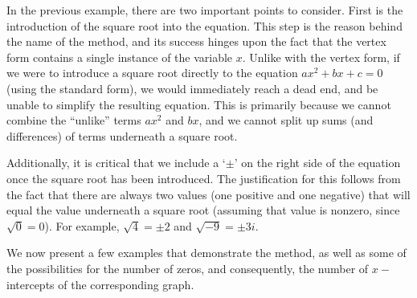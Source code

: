 \documentclass[12pt]{book}
\theoremstyle{definition}
\begin{document}
In the previous example, there are two important points to consider.  First is the introduction of the square root into the equation.  This step is the reason behind the name of the method, and its success hinges upon the fact that the vertex form contains a single instance of the variable $x$.  Unlike with the vertex form, if we were to introduce a square root directly to the equation $ax^2+bx+c=0$ (using the standard form), we would immediately reach a dead end, and be unable to simplify the resulting equation.  This is primarily because we cannot combine the ``unlike'' terms $ax^2$ and $bx$, and we cannot split up sums (and differences) of terms underneath a square root.\par
Additionally, it is critical that we include a `$\pm$' on the right side of the equation once the square root has been introduced.  The justification for this follows from the fact that there are always two values (one positive and one negative) that will equal the value underneath a square root (assuming that value is nonzero, since $\sqrt{0}=0$).  For example, $\sqrt{4}=\pm 2$ and $\sqrt{-9}=\pm 3i$.\par
We now present a few examples that demonstrate the method, as well as some of the possibilities for the number of zeros, and consequently, the number of $x-$intercepts of the corresponding graph.
\newpage
\end{document}
